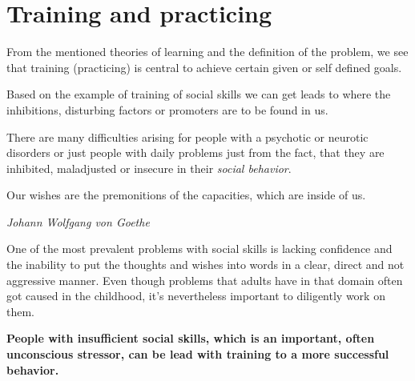 \documentclass[../main.tex]{subfiles}
\begin{document}
        \chapter{Training and practicing}

        From the mentioned theories of learning and the definition of the problem, we see that training (practicing) is central to achieve certain given or self defined goals.


        Based on the example of training of social skills we can get leads to where the inhibitions, disturbing factors or promoters are to be found in us.

        There are many difficulties arising for people with a psychotic or neurotic disorders or just people with daily problems just from the fact, that they are inhibited, maladjusted or insecure in their \emph{social behavior}.


\epigraph{Our wishes are the premonitions of the capacities, which are inside of us.}{\textit{Johann Wolfgang von Goethe}}

One of the most prevalent problems with social skills is lacking confidence and the inability to put the thoughts and wishes into words in a clear, direct and not aggressive manner. Even though problems that adults have in that domain often got caused in the childhood, it's nevertheless important to diligently work on them.

\textbf{People with insufficient social skills, which is an important, often unconscious stressor, can be lead with training to a more successful behavior.}

\vspace{1cm}

\end{document}
